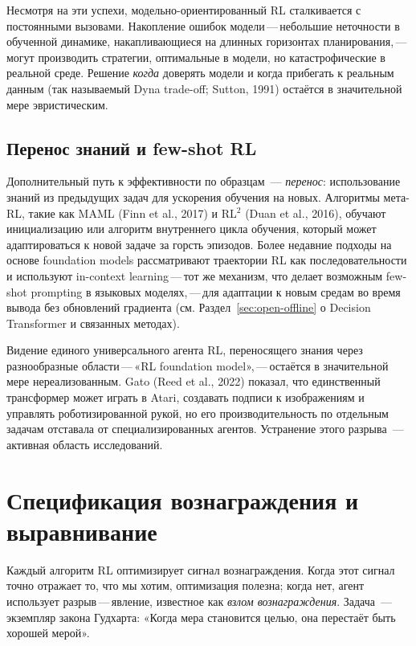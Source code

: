 Несмотря на эти успехи, модельно-ориентированный RL сталкивается с постоянными вызовами.
Накопление ошибок модели\,---\,небольшие неточности в обученной
динамике, накапливающиеся на длинных горизонтах планирования,\,---\,могут производить
стратегии, оптимальные в модели, но катастрофические в реальной
среде. Решение \emph{когда} доверять модели и когда
прибегать к реальным данным (так называемый Dyna trade-off; Sutton, 1991)
остаётся в значительной мере эвристическим.

\subsection{Перенос знаний и few-shot RL}

Дополнительный путь к эффективности по образцам~--- \emph{перенос}:
использование знаний из предыдущих задач для ускорения обучения на новых.
Алгоритмы мета-RL, такие как MAML (Finn et al., 2017) и
RL$^2$ (Duan et al., 2016), обучают инициализацию или алгоритм
внутреннего цикла обучения, который может адаптироваться к новой задаче за горсть
эпизодов. Более недавние подходы на основе foundation models рассматривают траектории RL
как последовательности и используют in-context learning\,---\,тот же
механизм, что делает возможным few-shot prompting в языковых моделях,\,---\,для
адаптации к новым средам во время вывода без обновлений градиента
(см. Раздел~\ref{sec:open-offline} о Decision Transformer и
связанных методах).

Видение единого универсального агента RL, переносящего знания
через разнообразные области\,---\,«RL foundation model»,\,---\,остаётся
в значительной мере нереализованным. Gato (Reed et al., 2022) показал, что единственный
трансформер может играть в Atari, создавать подписи к изображениям и управлять роботизированной
рукой, но его производительность по отдельным задачам отставала от специализированных агентов.
Устранение этого разрыва~--- активная область исследований.


\section{Спецификация вознаграждения и выравнивание}
\label{sec:open-alignment}

Каждый алгоритм RL оптимизирует сигнал вознаграждения. Когда этот сигнал
точно отражает то, что мы хотим, оптимизация полезна; когда нет,
агент использует разрыв\,---\,явление, известное как
\emph{взлом вознаграждения}. Задача~--- экземпляр закона Гудхарта: «Когда мера становится целью, она
перестаёт быть хорошей мерой».


